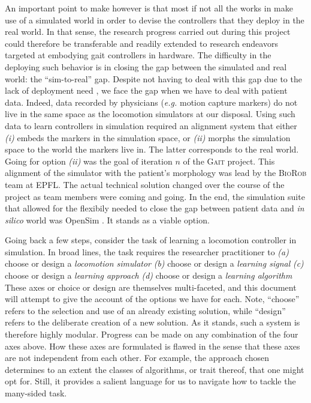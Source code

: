 \documentclass[12pt,a4paper]{article}
\begin{document}
An important point to make however is that most if not all the works in
\cite{Radosavovic2024-dm, Caluwaerts2023-ko, Yang2023-jr, Kaufmann2023-yc, Smith2022-sm}
make use of a simulated world in order to devise the controllers that they deploy in the real
world. In that sense, the research progress carried out during this project could therefore be
transferable and readily extended to research endeavors targeted at embodying gait controllers
in hardware. The difficulty in the deploying such behavior is in closing the gap between the
simulated and real world: the ``sim-to-real'' gap. Despite not having to deal with this gap due
to the lack of deployment need , we face the gap when we have to deal with patient
data. Indeed, data recorded by physicians (\textit{e.g.} motion capture markers) do not live in
the same space as the locomotion simulators at our disposal. Using such data to learn controllers
in simulation required an alignment system that either
\textit{(i)} embeds the markers in the simulation space, or
\textit{(ii)} morphs the simulation space to the world the markers live in.
The latter corresponds to the real world.
Going for option \textit{(ii)} was the goal of iteration $n$ of the \textsc{Gait} project.
This alignment of the simulator with the patient's morphology was lead by the \textsc{BioRob}
team at EPFL. The actual technical solution changed over the course of the project as team
members were coming and going. In the end, the simulation suite that allowed for the flexibily
needed to close the gap between patient data and \textit{in silico} world was
OpenSim \cite{Seth2011-ru}. It stands as a viable option.

Going back a few steps, consider the task of learning a locomotion controller in simulation.
In broad lines, the task requires the researcher practitioner to
\textit{(a)} choose or design a \emph{locomotion simulator}
\textit{(b)} choose or design a \emph{learning signal}
\textit{(c)} choose or design a \emph{learning approach}
\textit{(d)} choose or design a \emph{learning algorithm}
These axes or choice or design are themselves multi-faceted, and this document will attempt to
give the account of the options we have for each.
Note, ``choose'' refers to the selection and use of an already existing solution,
while ``design'' refers to the deliberate creation of a new solution.
As it stands, such a system is therefore highly modular.
Progress can be made on any combination of the four axes above.
How these axes are formulated is flawed in the sense that these axes are not independent from
each other. For example, the approach chosen determines to an extent the classes of algorithms,
or trait thereof, that one might opt for.
Still, it provides a salient language for us to navigate how to tackle the many-sided task. 
\end{document}
